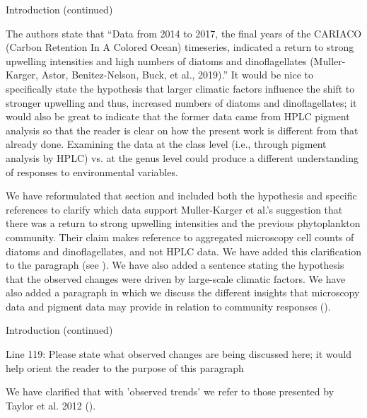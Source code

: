 \documentclass[12pt,english]{reviewresponse}
\begin{document}
\begin{revcomment}
	Introduction (continued)
    
    The authors state that “Data from 2014 to 2017, the final years of the CARIACO (Carbon Retention In A Colored Ocean) timeseries, indicated a return to strong upwelling intensities and high numbers of diatoms and dinoflagellates (Muller-Karger, Astor, Benitez-Nelson, Buck, et al., 2019).” It would be nice to specifically state the hypothesis that larger climatic factors influence the shift to stronger upwelling and thus, increased numbers of diatoms and dinoflagellates; it would also be great to indicate that the former data came from HPLC pigment analysis so that the reader is clear on how the present work is different from that already done. Examining the data at the class level (i.e., through pigment analysis by HPLC) vs. at the genus level could produce a different understanding of responses to environmental variables.
    
\end{revcomment}
\begin{revresponse}
	We have reformulated that section and included both the hypothesis and specific references to clarify which data support Muller-Karger et al.'s suggestion that there was a return to strong upwelling intensities and the previous phytoplankton community. Their claim makes reference to aggregated microscopy cell counts of diatoms and dinoflagellates, and not HPLC data. We have added this clarification to the paragraph (see ).
    We have also added a sentence stating the hypothesis that the observed changes were driven by large-scale climatic factors.
    We have also added a paragraph in which we discuss the different insights that microscopy data and pigment data may provide in relation to community responses ().
\end{revresponse}

\begin{revcomment}
	Introduction (continued)
    
    Line 119: Please state what observed changes are being discussed here; it would help orient the reader to the purpose of this paragraph
\end{revcomment}
\begin{revresponse}
	We have clarified that with 'observed trends' we refer to those presented by Taylor et al. 2012 ().
\end{revresponse}
\end{document}

